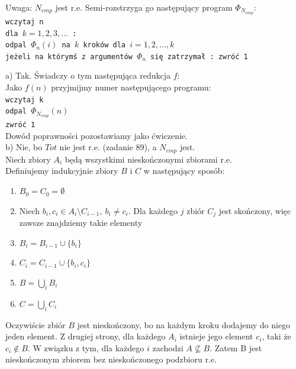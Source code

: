 \documentclass[a4paper,11pt]{article}
\newenvironment{zadanie}[1]
  {\renewcommand\theinnercustomthm{#1}\innercustomthm}
  {\endinnercustomthm}
\begin{document}
\begin{zadanie}{105}
\end{zadanie}
Uwaga: $N_{emp}$ jest r.e. Semi-rozstrzyga go następujący program $\Phi_{N_{emp}}$: \\
\texttt{wczytaj n \\ dla $k=1,2,3,...$ : \\ odpal $\Phi_n(i)$ na $k$ kroków dla $i=1,2,...,k$ \\ jeżeli na którymś z argumentów $\Phi_n$ się zatrzymał : zwróć 1 \\}

a) Tak. Świadczy o tym następująca redukcja $f$: \\
Jako $f(n)$ przyjmijmy numer następującego programu: \\
\texttt{wczytaj k \\ odpal $\Phi_{N_{emp}}(n)$ \\ zwróć 1 \\}
Dowód poprawności pozostawiamy jako ćwiczenie. \\

b) Nie, bo $Tot$ nie jest r.e. (zadanie $89$), a $N_{emp}$ jest.\\


\begin{zadanie}{107}
\end{zadanie}
Niech zbiory $A_i$ będą wszystkimi nieskończonymi zbiorami r.e. \\
Definiujemy indukcyjnie zbiory $B$ i $C$ w następujący sposób: \\
\begin{enumerate}
 \item $B_0 = C_0 = \emptyset$
 \item Niech $b_i,c_i \in A_i \setminus C_{i-1},\ b_i \neq c_i$. Dla każdego $j$ zbiór $C_j$ jest skończony, więc zawsze znajdziemy
 takie elementy
 \item $B_i = B_{i-1} \cup \{ b_i \}$
 \item $C_i = C_{i-1} \cup \{ b_i, c_i \}$
 \item $B = \bigcup_i B_i$
 \item $C = \bigcup_i C_i$
\end{enumerate}
Oczywiście zbiór $B$ jest nieskończony, bo na każdym kroku dodajemy do niego jeden element. Z drugiej strony, dla każdego $A_i$
istnieje jego element $c_i$, taki że $c_i \notin B$. W związku z tym, dla każdego $i$ zachodzi $A \nsubseteq B$. 
Zatem B jest nieskończonym zbiorem bez nieskończonego podzbioru r.e.
\end{document}
